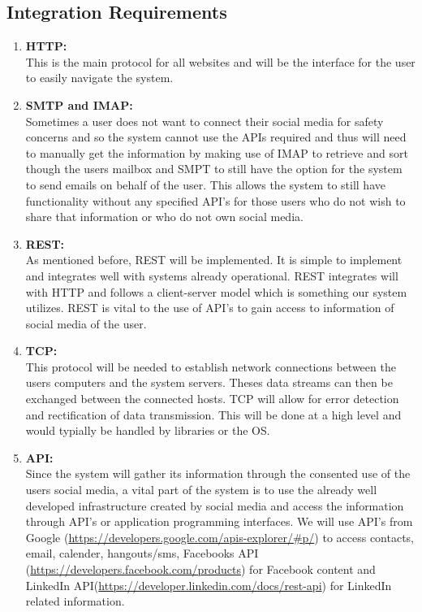 \documentclass[hidelinks,english]{article}
\begin{document}
		
		\subsection{Integration Requirements}
		\begin{enumerate}
        \item \textbf{HTTP:}\\
            This is the main protocol for all websites and will be the interface for the user to easily navigate the system.
        \item \textbf{SMTP and IMAP:}\\
            Sometimes a user does not want to connect their social media for safety concerns and so the system cannot use the APIs required and thus will need to manually get the information by making use of IMAP to retrieve and sort though the users mailbox and SMPT to still have the option for the system to send emails on behalf of the user. This allows the system to still have functionality without any specified API's for those users who do not wish to share that information or who do not own social media.\\
        \item \textbf{REST:}\\
            As mentioned before, REST will be implemented. It is simple to implement and integrates well with systems already operational. REST integrates will with HTTP and follows a client-server model which is something our system utilizes. REST is vital to the use of API's to gain access to information of social media of the user.\\
        \item \textbf{TCP:}\\
            This protocol will be needed to establish network connections between the users computers and the system servers. Theses data streams can then be exchanged between the connected hosts. TCP will allow for error detection and rectification of data transmission. This will be done at a high level and would typially be handled by libraries or the OS.\\
        
        \item \textbf{API:}\\
            Since the system will gather its information through the consented use of the users social media, a vital part of the system is to use the already well developed infrastructure created by social media and access the information through API's or application programming interfaces. We will use API's from Google (\sloppy\url{https://developers.google.com/apis-explorer/\#p/}) to access contacts, email, calender, hangouts/sms, Facebooks API (\sloppy\url{https://developers.facebook.com/products}) for Facebook content and LinkedIn API(\sloppy\url{https://developer.linkedin.com/docs/rest-api}) for LinkedIn related information.\\
    \end{enumerate}
		
\end{document}
